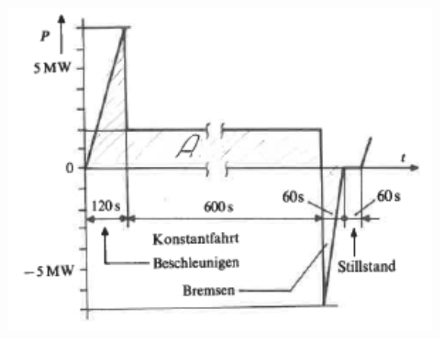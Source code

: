 \documentclass[10pt,ngerman]{scrartcl}
\begin{document}
\begin{figure}[H]
	\centering
	\includegraphics[scale=0.5]{group_work_1.png}
\end{figure}
\end{document}
